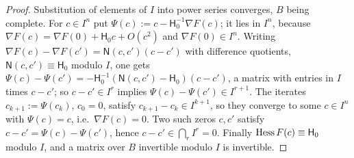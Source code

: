 \begin{proof}
Substitution of elements of $I$ into power series converges, $B$ being complete. For $c\in I^n$ put $\Psi(c):=c-\mathsf H_0^{-1}\nabla F(c)$; it lies in $I^n$, because $\nabla F(c)=\nabla F(0)+\mathsf H_0c+O(c^2)$ and $\nabla F(0)\in I^n$. Writing $\nabla F(c)-\nabla F(c')=\mathsf N(c,c')(c-c')$ with difference quotients, $\mathsf N(c,c')\equiv\mathsf H_0$ modulo $I$, one gets $\Psi(c)-\Psi(c')=-\mathsf H_0^{-1}(\mathsf N(c,c')-\mathsf H_0)(c-c')$, a matrix with entries in $I$ times $c-c'$; so $c-c'\in I^r$ implies $\Psi(c)-\Psi(c')\in I^{r+1}$. The iterates $c_{k+1}:=\Psi(c_k)$, $c_0=0$, satisfy $c_{k+1}-c_k\in I^{k+1}$, so they converge to some $c\in I^n$ with $\Psi(c)=c$, i.e.\ $\nabla F(c)=0$. Two such zeros $c,c'$ satisfy $c-c'=\Psi(c)-\Psi(c')$, hence $c-c'\in\bigcap_rI^r=0$. Finally $\operatorname{Hess} F(c)\equiv\mathsf H_0$ modulo $I$, and a matrix over $B$ invertible modulo $I$ is invertible.
\end{proof}


